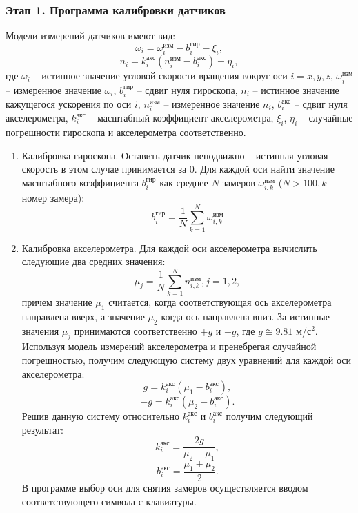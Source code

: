 \solutionSection

\subsubsection*{Этап 1. Программа калибровки датчиков}

Модели измерений датчиков имеют вид:
$$\omega_i=\omega_i^\text{изм}-b_i^\text{гир}-\xi_i,$$
$$n_i=k_i^\text{акс}(n_i^\text{изм}-b_i^\text{акс})-\eta_i,$$
где $\omega_i$ – истинное значение угловой скорости вращения вокруг оси $i={x,y,z}$, $\omega_i^\text{изм}$ – измеренное значение $\omega_i$, $b_i^\text{гир}$ – сдвиг нуля гироскопа, $n_i$ – истинное значение кажущегося ускорения по оси $i$, $n_i^\text{изм}$ – измеренное значение $n_i$, $b_i^\text{акс}$ – сдвиг нуля акселерометра, $k_i^\text{акс}$ – масштабный коэффициент акселерометра, $\xi_i$, $\eta_i$ – случайные погрешности гироскопа и акселерометра соответственно.

\begin{enumerate}
    \item Калибровка гироскопа. Оставить датчик неподвижно – истинная угловая скорость в этом случае принимается за 0. Для каждой оси найти значение масштабного коэффициента $b_i^\text{гир}$ как среднее $N$ замеров $\omega_{i,k}^\text{изм}$ ($N>100,k$ – номер замера):
           $$b_i^\text{гир}=\frac{1}{N}\sum_{k=1}^N \omega_{i,k}^\text{изм}$$

    \item Калибровка акселерометра. Для каждой оси акселерометра вычислить следующие два средних значения:
        $$\mu_j=\frac{1}{N}\sum_{k=1}^N n_{i,k}^\text{изм},j={1,2},$$
        причем значение $\mu_1$ считается, когда соответствующая ось акселерометра направлена вверх, а значение $\mu_2$ когда ось направлена вниз. За истинные значения $\mu_j$ принимаются соответственно $+g$ и $-g$, где $g\cong 9.81$ м/с$^2$. Используя модель измерений акселерометра и пренебрегая случайной погрешностью, получим следующую систему двух уравнений для каждой оси акселерометра:
        $$g=k_i^\text{акс} (\mu_1-b_i^\text{акс} ),$$
        $$-g=k_i^\text{акс} (\mu_2-b_i^\text{акс} ).$$
        Решив данную систему относительно $k_i^\text{акс}$ и $b_i^\text{акс}$  получим следующий результат:
        $$k_i^\text{акс}=\frac{2g}{\mu_2-\mu_1},$$
        $$b_i^\text{акс}=\frac{\mu_1+\mu_2}{2}.$$
        В программе выбор оси для снятия замеров осуществляется вводом соответствующего символа с клавиатуры.
\end{enumerate}

